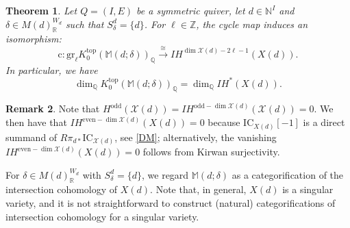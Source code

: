 \documentclass [11pt,oneside,a4paper,mathscr]{amsart}
\newtheorem{thm}{Theorem}[section]
\newtheorem{cor}[thm]{Corollary}
\theoremstyle{definition}
\newtheorem{remark}[thm]{Remark}
\newcommand{\X}{\mathscr{X}}
\begin{document}
\begin{thm}\label{thmWzero}
Let $Q=(I, E)$ be a symmetric quiver, 
let $d\in \mathbb{N}^I$
and $\delta \in M(d)_{\mathbb{R}}^{W_d}$
such that $S_{\delta}^d=\{d\}$. 
For $\ell\in\mathbb{Z}$, the cycle map induces an isomorphism:
   \[\mathrm{c}\colon \mathrm{gr}_\ell K^{\mathrm{top}}_0(\mathbb{M}(d; \delta))_{\mathbb{Q}}\xrightarrow{\cong} I\!H^{\dim \X(d)-2\ell-1}(X(d)).\]
   In particular, we have 
    \[\dim_\mathbb{Q} K^{\mathrm{top}}_0(\mathbb{M}(d; \delta))_{\mathbb{Q}}=\dim_\mathbb{Q} I\!H^{\ast}(X(d)).\]   
\end{thm}
\begin{remark}
  Note that $H^{\mathrm{odd}}(\X(d))=I\!H^{\mathrm{odd}-\dim \X(d)}(\X(d))=0$. We then have that $I\!H^{\mathrm{even}-\dim \X(d)}(X(d))=0$ because $\mathrm{IC}_{X(d)}[-1]$ is a direct summand of $R\pi_{d\ast}\mathrm{IC}_{\X(d)}$, see \eqref{DM}; alternatively, the vanishing $I\!H^{\mathrm{even}-\dim \X(d)}(X(d))=0$ follows from Kirwan surjectivity.   
\end{remark}




For $\delta \in M(d)_{\mathbb{R}}^{W_d}$
with $S_{\delta}^d=\{d\}$, we 
regard $\mathbb{M}(d; \delta)$ as a categorification of the intersection cohomology of $X(d)$. Note that, in general, $X(d)$ is a singular variety, and it is not straightforward to construct (natural) categorifications of intersection cohomology for a singular variety.
\end{document}
